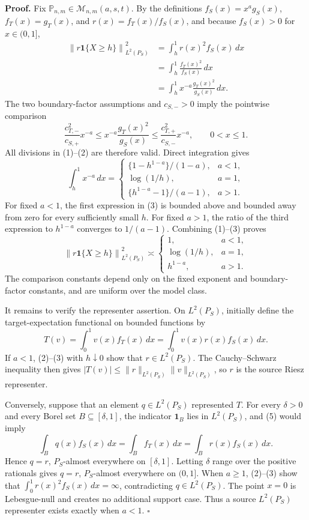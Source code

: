 \textbf{Proof.}
Fix \(\mathbb P_{n,m}\in\mathcal M_{n,m}(a,s,t)\). By the definitions \(f_S(x)=x^ag_S(x)\), \(f_T(x)=g_T(x)\), and \(r(x)=f_T(x)/f_S(x)\), and because \(f_S(x)>0\) for \(x\in(0,1]\),
\[
\begin{aligned}
\left\|r\mathbf 1\{X\ge h\}\right\|_{L^2(P_S)}^2
&=\int_h^1r(x)^2f_S(x)\,dx\\
&=\int_h^1\frac{f_T(x)^2}{f_S(x)}\,dx\\
&=\int_h^1x^{-a}\frac{g_T(x)^2}{g_S(x)}\,dx.
\end{aligned}
\tag{1}
\]
The two boundary-factor assumptions and \(c_{S,-}>0\) imply the pointwise comparison
\[
\frac{c_{T,-}^2}{c_{S,+}}x^{-a}
\le x^{-a}\frac{g_T(x)^2}{g_S(x)}
\le\frac{c_{T,+}^2}{c_{S,-}}x^{-a},
\qquad 0<x\le1.
\tag{2}
\]
All divisions in (1)--(2) are therefore valid. Direct integration gives
\[
\int_h^1x^{-a}\,dx=
\begin{cases}
\{1-h^{1-a}\}/(1-a),&a<1,\\
\log(1/h),&a=1,\\
\{h^{1-a}-1\}/(a-1),&a>1.
\end{cases}
\tag{3}
\]
For fixed \(a<1\), the first expression in (3) is bounded above and bounded away from zero for every sufficiently small \(h\). For fixed \(a>1\), the ratio of the third expression to \(h^{1-a}\) converges to \(1/(a-1)\). Combining (1)--(3) proves
\[
\left\|r\mathbf 1\{X\ge h\}\right\|_{L^2(P_S)}^2
\asymp
\begin{cases}
1,&a<1,\\
\log(1/h),&a=1,\\
h^{1-a},&a>1.
\end{cases}
\tag{4}
\]
The comparison constants depend only on the fixed exponent and boundary-factor constants, and are uniform over the model class.

It remains to verify the representer assertion. On \(L^2(P_S)\), initially define the target-expectation functional on bounded functions by
\[
T(v)=\int_0^1v(x)f_T(x)\,dx
=\int_0^1v(x)r(x)f_S(x)\,dx.
\tag{5}
\]
If \(a<1\), (2)--(3) with \(h\downarrow0\) show that \(r\in L^2(P_S)\). The Cauchy--Schwarz inequality then gives \(|T(v)|\le\|r\|_{L^2(P_S)}\|v\|_{L^2(P_S)}\), so \(r\) is the source Riesz representer.

Conversely, suppose that an element \(q\in L^2(P_S)\) represented \(T\). For every \(\delta>0\) and every Borel set \(B\subseteq[\delta,1]\), the indicator \(\mathbf 1_B\) lies in \(L^2(P_S)\), and (5) would imply
\[
\int_Bq(x)f_S(x)\,dx=\int_Bf_T(x)\,dx
=\int_Br(x)f_S(x)\,dx.
\tag{6}
\]
Hence \(q=r\), \(P_S\)-almost everywhere on \([\delta,1]\). Letting \(\delta\) range over the positive rationals gives \(q=r\), \(P_S\)-almost everywhere on \((0,1]\). When \(a\ge1\), (2)--(3) show that \(\int_0^1r(x)^2f_S(x)\,dx=\infty\), contradicting \(q\in L^2(P_S)\). The point \(x=0\) is Lebesgue-null and creates no additional support case. Thus a source \(L^2(P_S)\) representer exists exactly when \(a<1\). \(\square\)